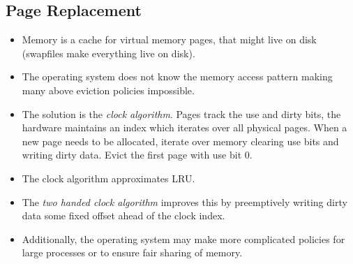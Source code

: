 \documentclass[12pt]{article}
\begin{document}
\subsection{Page Replacement}
\begin{itemize}
	\item Memory is a cache for virtual memory pages, that might live on disk (swapfiles make everything live on disk). 
	\item The operating system does not know the memory access pattern making many above eviction policies impossible. 
	\item The solution is the \textit{clock algorithm}. Pages track the use and dirty bits, the hardware maintains an index which iterates over all physical pages. When a new page needs to be allocated, iterate over memory clearing use bits and writing dirty data. Evict the first page with use bit 0.
	\item The clock algorithm approximates LRU. 
	\item The \textit{two handed clock algorithm} improves this by preemptively writing dirty data some fixed offset ahead of the clock index. 
	\item Additionally, the operating system may make more complicated policies for large processes or to ensure fair sharing of memory. 
\end{itemize}
\end{document}
